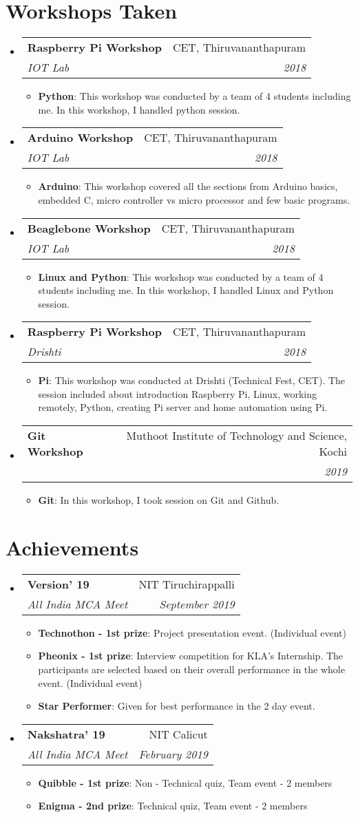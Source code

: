 \documentclass[letterpaper,11pt]{article}
\makeatletter
\newcommand{\resumeItem}[2]{
	\item\small{
    		\textbf{#1}{: #2 \vspace{-2pt}}
  	}
}
\newcommand{\resumeSubheading}[4]{
  	\vspace{-1pt}\item
    	\begin{tabular*}{0.97\textwidth}[t]{l@{\extracolsep{\fill}}r}
      		\textbf{#1} & #2 \\
      		\textit{\small#3} & \textit{\small #4} \\
    	\end{tabular*}\vspace{-5pt}
}
\newcommand{\resumeSubHeadingListStart}{\begin{itemize}[leftmargin=*]}
\newcommand{\resumeSubHeadingListEnd}{\end{itemize}}
\newcommand{\resumeItemListStart}{\begin{itemize}}
\newcommand{\resumeItemListEnd}{\end{itemize}\vspace{-5pt}}
\makeatother
\begin{document}
\section{Workshops Taken}
  	\resumeSubHeadingListStart
    		\resumeSubheading
     			{Raspberry Pi Workshop}{CET, Thiruvananthapuram}
      			{IOT Lab}{2018}
      			\resumeItemListStart
       				 \resumeItem{Python}
          				{This workshop was conducted by a team of 4 students including me. In this workshop, I handled python session.}
      			\resumeItemListEnd
      		\resumeSubheading
      			{Arduino Workshop}{CET, Thiruvananthapuram}
     			{IOT Lab}{2018}
      			\resumeItemListStart
        				\resumeItem{Arduino}
          				{This workshop covered all the sections from Arduino basics, embedded C, micro controller vs micro processor and few basic programs.}
     	 		\resumeItemListEnd
      		\resumeSubheading
     		 	{Beaglebone Workshop}{CET, Thiruvananthapuram}
      			{IOT Lab}{2018}
      			\resumeItemListStart
        				\resumeItem{Linux and Python}
          				{This workshop was conducted by a team of 4 students including me. In this workshop, I handled Linux and Python session.}
      			\resumeItemListEnd
      		\resumeSubheading
      			{Raspberry Pi Workshop}{CET, Thiruvananthapuram}
     			{Drishti}{2018}
      			\resumeItemListStart
        				\resumeItem{Pi}
          				{This workshop was conducted at Drishti (Technical Fest, CET). The session included about introduction Raspberry Pi, Linux, working remotely, Python, creating Pi server and home automation using Pi.}
      			\resumeItemListEnd
      		\resumeSubheading
     			 {Git Workshop}{Muthoot Institute of Technology and Science, Kochi}
      			{}{2019}
     	 		\resumeItemListStart
        				\resumeItem{Git}
          				{In this workshop, I took session on Git and Github.}
      			\resumeItemListEnd
 	 \resumeSubHeadingListEnd

\section{Achievements}
  	\resumeSubHeadingListStart
		\resumeSubheading
      			{Version' 19}{NIT Tiruchirappalli}
      			{All India MCA Meet}{September 2019}
			\resumeItemListStart
      				\resumeItem{Technothon - 1st prize}
          				{Project presentation event. (Individual event)}
				\resumeItem{Pheonix - 1st prize}
          				{Interview competition for KLA's Internship. The participants are selected based on their overall performance in the whole event. (Individual event)}
				\resumeItem{Star Performer}
          				{Given for best performance in the 2 day event.}
       			\resumeItemListEnd
   		\resumeSubheading
      			{Nakshatra' 19}{NIT Calicut}
      			{All India MCA Meet}{February 2019}
			\resumeItemListStart
      				\resumeItem{Quibble - 1st prize}
          				{Non - Technical quiz, Team event - 2 members}
				\resumeItem{Enigma - 2nd prize}
          				{Technical quiz, Team event - 2 members}
       			\resumeItemListEnd
  	\resumeSubHeadingListEnd
\end{document}
